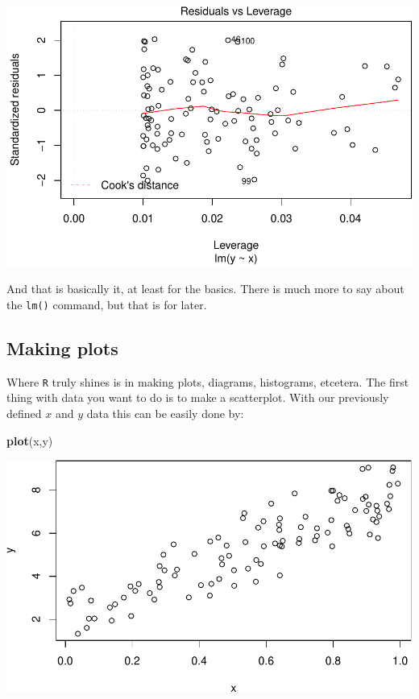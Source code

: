 \documentclass[]{article}
\newenvironment{Shaded}{\begin{snugshade}}{\end{snugshade}}
\newcommand{\KeywordTok}[1]{\textcolor[rgb]{0.13,0.29,0.53}{\textbf{#1}}}
\newcommand{\NormalTok}[1]{#1}
\theoremstyle{definition}
\theoremstyle{definition}
\theoremstyle{definition}
\theoremstyle{remark}
\begin{document}
\includegraphics{./unnamed-chunk-26-4.pdf}

And that is basically it, at least for the basics. There is much more to
say about the \texttt{lm()} command, but that is for later.

\subsection{Making plots}\label{making-plots}

Where \texttt{R} truly shines is in making plots, diagrams, histograms,
etcetera. The first thing with data you want to do is to make a
scatterplot. With our previously defined \(x\) and \(y\) data this can
be easily done by:

\begin{Shaded}
\begin{Highlighting}[]
\KeywordTok{plot}\NormalTok{(x,y)}
\end{Highlighting}
\end{Shaded}

\includegraphics{./unnamed-chunk-27-1.pdf}
\end{document}

